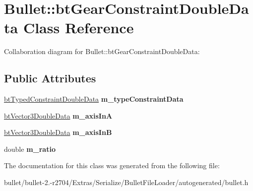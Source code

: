 \hypertarget{class_bullet_1_1bt_gear_constraint_double_data}{\section{Bullet\+:\+:bt\+Gear\+Constraint\+Double\+Data Class Reference}
\label{class_bullet_1_1bt_gear_constraint_double_data}
}


Collaboration diagram for Bullet\+:\+:bt\+Gear\+Constraint\+Double\+Data\+:
\subsection*{Public Attributes}
\begin{DoxyCompactItemize}
\item 
\hypertarget{class_bullet_1_1bt_gear_constraint_double_data_a7257d0010c42d6f04abd272d829ae43c}{\hyperlink{class_bullet_1_1bt_typed_constraint_double_data}{bt\+Typed\+Constraint\+Double\+Data} {\bfseries m\+\_\+type\+Constraint\+Data}}\label{class_bullet_1_1bt_gear_constraint_double_data_a7257d0010c42d6f04abd272d829ae43c}

\item 
\hypertarget{class_bullet_1_1bt_gear_constraint_double_data_a511d677985729cdac34d70785f628bad}{\hyperlink{class_bullet_1_1bt_vector3_double_data}{bt\+Vector3\+Double\+Data} {\bfseries m\+\_\+axis\+In\+A}}\label{class_bullet_1_1bt_gear_constraint_double_data_a511d677985729cdac34d70785f628bad}

\item 
\hypertarget{class_bullet_1_1bt_gear_constraint_double_data_a71cdd70fe93c389246b153eac7a5a800}{\hyperlink{class_bullet_1_1bt_vector3_double_data}{bt\+Vector3\+Double\+Data} {\bfseries m\+\_\+axis\+In\+B}}\label{class_bullet_1_1bt_gear_constraint_double_data_a71cdd70fe93c389246b153eac7a5a800}

\item 
\hypertarget{class_bullet_1_1bt_gear_constraint_double_data_a5caa87e0320354b2dd9ab6237ff361e0}{double {\bfseries m\+\_\+ratio}}\label{class_bullet_1_1bt_gear_constraint_double_data_a5caa87e0320354b2dd9ab6237ff361e0}

\end{DoxyCompactItemize}


The documentation for this class was generated from the following file\+:\begin{DoxyCompactItemize}
\item 
bullet/bullet-\/2.-\/r2704/\+Extras/\+Serialize/\+Bullet\+File\+Loader/autogenerated/bullet.\+h\end{DoxyCompactItemize}
